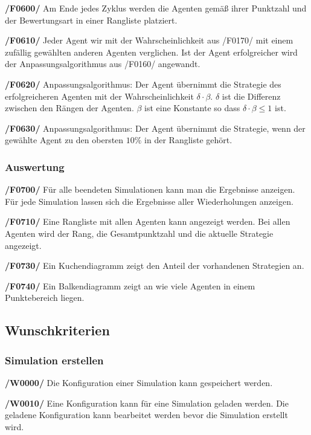 \textbf{/F0600/}
Am Ende jedes Zyklus werden die Agenten gemäß ihrer Punktzahl und der Bewertungsart in einer Rangliste platziert.

\textbf{/F0610/}
Jeder Agent wir mit der Wahrscheinlichkeit aus /F0170/ mit einem zufällig gewählten anderen Agenten verglichen. Ist der Agent erfolgreicher wird der Anpassungsalgorithmus aus /F0160/ angewandt.

\textbf{/F0620/}
Anpassungsalgorithmus: Der Agent übernimmt die Strategie des erfolgreicheren Agenten mit der Wahrscheinlichkeit $\delta \cdot \beta$. $\delta$ ist die Differenz zwischen den Rängen der Agenten. $\beta$ ist eine Konstante so dass $\delta \cdot \beta \leq 1$ ist.

\textbf{/F0630/}
Anpassungsalgorithmus: Der Agent übernimmt die Strategie, wenn der gewählte Agent zu den obersten $10\%$ in der Rangliste gehört.

\subsubsection{Auswertung}

\textbf{/F0700/}
Für alle beendeten Simulationen kann man die Ergebnisse anzeigen. Für jede Simulation lassen sich die Ergebnisse aller Wiederholungen anzeigen.

\textbf{/F0710/}
Eine Rangliste mit allen Agenten kann angezeigt werden. Bei allen Agenten wird der Rang, die Gesamtpunktzahl und die aktuelle Strategie angezeigt.

\textbf{/F0730/}
Ein Kuchendiagramm zeigt den Anteil der vorhandenen Strategien an.

\textbf{/F0740/}
Ein Balkendiagramm zeigt an wie viele Agenten in einem Punktebereich liegen. 

\subsection{Wunschkriterien}

\subsubsection{Simulation erstellen}

\textbf{/W0000/}
Die Konfiguration einer Simulation kann gespeichert werden.

\textbf{/W0010/}
Eine Konfiguration kann für eine Simulation geladen werden. Die geladene Konfiguration kann bearbeitet werden bevor die Simulation erstellt wird.

